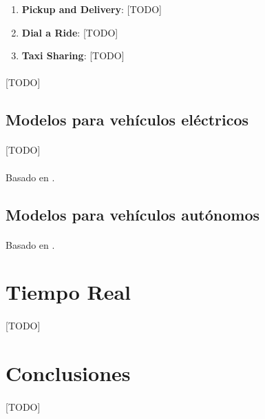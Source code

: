 \documentclass{subfiles}
\begin{document}
        \begin{enumerate}

          \item \textbf{Pickup and Delivery}: [TODO]

          \item \textbf{Dial a Ride}: [TODO]

          \item \textbf{Taxi Sharing}: [TODO]

        \end{enumerate}

        \paragraph{}
        [TODO]

      \subsection{Modelos para vehículos eléctricos}
      \label{sec:formulation_extensions_electric}

        \paragraph{}
        [TODO]

        \paragraph{}
        Basado en \cite{erdougan2012green}.

      \subsection{Modelos para vehículos autónomos}
      \label{sec:formulation_extensions_autonomous}

        \paragraph{}
        Basado en \cite{dial1995autonomous,bongiovanni2019electric}.



    \section{Tiempo Real}
    \label{sec:formulation_real_time}

      \paragraph{}
      [TODO]

    \section{Conclusiones}
    \label{sec:formulation_conclusions}

      \paragraph{}
      [TODO]
\end{document}
